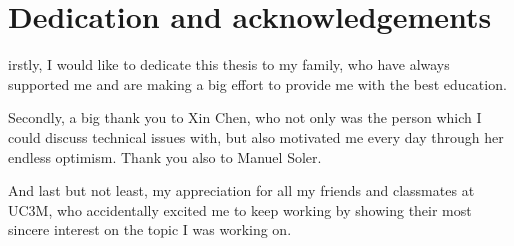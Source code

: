 %
%

\chapter*{Dedication and acknowledgements}
\begin{SingleSpace}
irstly, I would like to dedicate this thesis to my family, who have always supported me and are making a big effort to provide me with the best education.

\hspace{2em}  Secondly, a big thank you to Xin Chen, who not only was the person which I could discuss technical issues with, but also motivated me every day through her endless optimism. Thank you also to Manuel Soler.

And last but not least, my appreciation for all my friends and classmates at UC3M, who accidentally excited me to keep working by showing their most sincere interest on the topic I was working on.
\end{SingleSpace}
\clearpage
